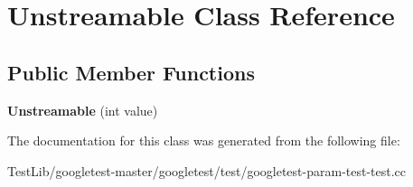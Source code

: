 \hypertarget{classUnstreamable}{}\section{Unstreamable Class Reference}
\label{classUnstreamable}
\subsection*{Public Member Functions}
\begin{DoxyCompactItemize}
\item 
\mbox{\label{classUnstreamable_aec8af0d0f78468a9094f1b36332a0842}} 
{\bfseries Unstreamable} (int value)
\end{DoxyCompactItemize}


The documentation for this class was generated from the following file\+:\begin{DoxyCompactItemize}
\item 
Test\+Lib/googletest-\/master/googletest/test/googletest-\/param-\/test-\/test.\+cc\end{DoxyCompactItemize}
